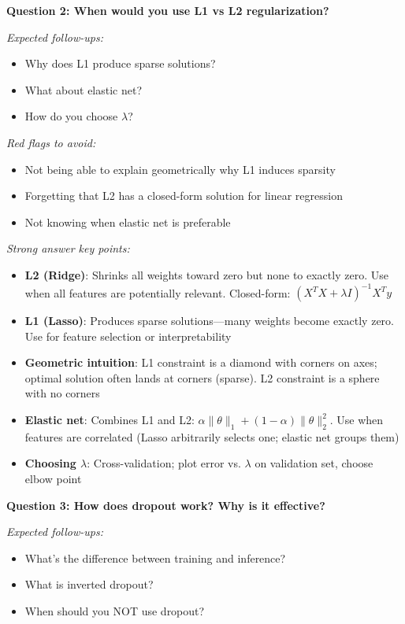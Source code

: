 \documentclass[../../main.tex]{subfiles}
\begin{document}
\begin{interviewquestions}
\vspace{0.5em}
\textbf{Question 2: When would you use L1 vs L2 regularization?}

\textit{Expected follow-ups:}
\begin{itemize}
    \item Why does L1 produce sparse solutions?
    \item What about elastic net?
    \item How do you choose $\lambda$?
\end{itemize}

\textit{Red flags to avoid:}
\begin{itemize}
    \item Not being able to explain geometrically why L1 induces sparsity
    \item Forgetting that L2 has a closed-form solution for linear regression
    \item Not knowing when elastic net is preferable
\end{itemize}

\textit{Strong answer key points:}
\begin{itemize}
    \item \textbf{L2 (Ridge)}: Shrinks all weights toward zero but none to exactly zero. Use when all features are potentially relevant. Closed-form: $(X^TX + \lambda I)^{-1}X^Ty$
    \item \textbf{L1 (Lasso)}: Produces sparse solutions---many weights become exactly zero. Use for feature selection or interpretability
    \item \textbf{Geometric intuition}: L1 constraint is a diamond with corners on axes; optimal solution often lands at corners (sparse). L2 constraint is a sphere with no corners
    \item \textbf{Elastic net}: Combines L1 and L2: $\alpha\|\theta\|_1 + (1-\alpha)\|\theta\|_2^2$. Use when features are correlated (Lasso arbitrarily selects one; elastic net groups them)
    \item \textbf{Choosing $\lambda$}: Cross-validation; plot error vs. $\lambda$ on validation set, choose elbow point
\end{itemize}

\vspace{0.5em}
\textbf{Question 3: How does dropout work? Why is it effective?}

\textit{Expected follow-ups:}
\begin{itemize}
    \item What's the difference between training and inference?
    \item What is inverted dropout?
    \item When should you NOT use dropout?
\end{itemize}


\end{interviewquestions}
\end{document}
